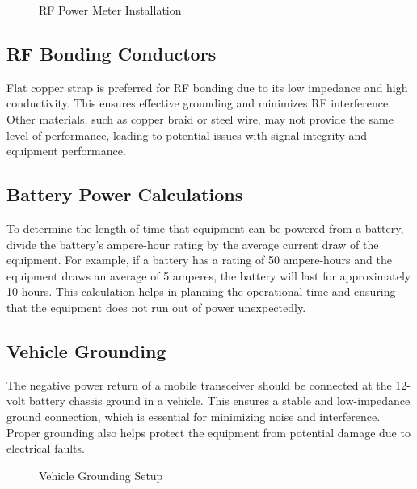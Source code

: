 \begin{figure}[h]
    \centering
    \caption{RF Power Meter Installation}
    \label{fig:rf_power_meter}
\end{figure}

\subsection*{RF Bonding Conductors}
Flat copper strap is preferred for RF bonding due to its low impedance and high conductivity. This ensures effective grounding and minimizes RF interference. Other materials, such as copper braid or steel wire, may not provide the same level of performance, leading to potential issues with signal integrity and equipment performance.

\subsection*{Battery Power Calculations}
To determine the length of time that equipment can be powered from a battery, divide the battery's ampere-hour rating by the average current draw of the equipment. For example, if a battery has a rating of 50 ampere-hours and the equipment draws an average of 5 amperes, the battery will last for approximately 10 hours. This calculation helps in planning the operational time and ensuring that the equipment does not run out of power unexpectedly.

\subsection*{Vehicle Grounding}
The negative power return of a mobile transceiver should be connected at the 12-volt battery chassis ground in a vehicle. This ensures a stable and low-impedance ground connection, which is essential for minimizing noise and interference. Proper grounding also helps protect the equipment from potential damage due to electrical faults.

\begin{figure}[h]
    \centering
    \caption{Vehicle Grounding Setup}
    \label{fig:vehicle_grounding}
\end{figure}

